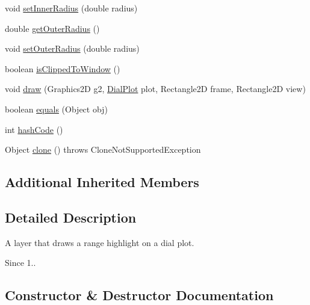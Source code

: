 \begin{DoxyCompactItemize}
\item 
void \mbox{\hyperlink{classorg_1_1jfree_1_1chart_1_1plot_1_1dial_1_1_standard_dial_range_a3c79913727054b5ac45caac06f77fdaf}{set\+Inner\+Radius}} (double radius)
\item 
double \mbox{\hyperlink{classorg_1_1jfree_1_1chart_1_1plot_1_1dial_1_1_standard_dial_range_a46f44c8aa6eabe91b754ee9a852a6740}{get\+Outer\+Radius}} ()
\item 
void \mbox{\hyperlink{classorg_1_1jfree_1_1chart_1_1plot_1_1dial_1_1_standard_dial_range_a7596d8ab0a85553ff4b9f09985e979c8}{set\+Outer\+Radius}} (double radius)
\item 
boolean \mbox{\hyperlink{classorg_1_1jfree_1_1chart_1_1plot_1_1dial_1_1_standard_dial_range_a9bbb52c3f7a46027f8ce7a2736b14391}{is\+Clipped\+To\+Window}} ()
\item 
void \mbox{\hyperlink{classorg_1_1jfree_1_1chart_1_1plot_1_1dial_1_1_standard_dial_range_a2a505dac3b8a9cec54e872e9165348cc}{draw}} (Graphics2D g2, \mbox{\hyperlink{classorg_1_1jfree_1_1chart_1_1plot_1_1dial_1_1_dial_plot}{Dial\+Plot}} plot, Rectangle2D frame, Rectangle2D view)
\item 
boolean \mbox{\hyperlink{classorg_1_1jfree_1_1chart_1_1plot_1_1dial_1_1_standard_dial_range_a0ce52e0edf0a0080483bf52a8425a8d8}{equals}} (Object obj)
\item 
int \mbox{\hyperlink{classorg_1_1jfree_1_1chart_1_1plot_1_1dial_1_1_standard_dial_range_ac31065601d811822c607867920ca037c}{hash\+Code}} ()
\item 
Object \mbox{\hyperlink{classorg_1_1jfree_1_1chart_1_1plot_1_1dial_1_1_standard_dial_range_a2b54026fb460d5c1cb6463812ee5dd8b}{clone}} ()  throws Clone\+Not\+Supported\+Exception 
\end{DoxyCompactItemize}
\subsection*{Additional Inherited Members}


\subsection{Detailed Description}
A layer that draws a range highlight on a dial plot.

\begin{DoxySince}{Since}
1.. 
\end{DoxySince}


\subsection{Constructor \& Destructor Documentation}
\mbox{\label{classorg_1_1jfree_1_1chart_1_1plot_1_1dial_1_1_standard_dial_range_ac51c8bc672e1024628be5586fd008ebb}} 
